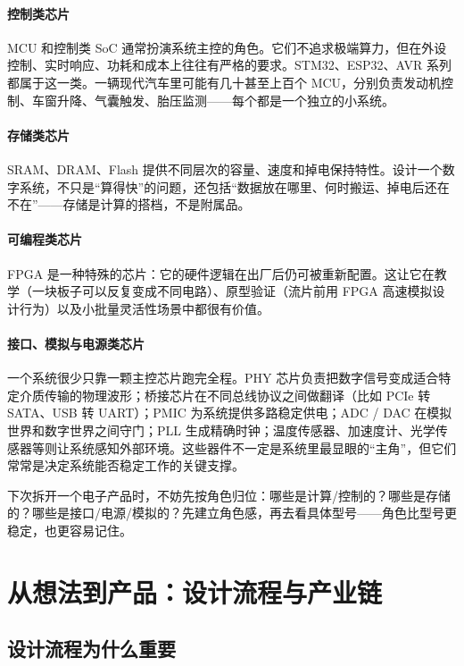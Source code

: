 \documentclass[11pt,a4paper]{article}
\begin{document}
\paragraph{控制类芯片}
MCU 和控制类 SoC 通常扮演系统主控的角色。它们不追求极端算力，但在外设控制、实时响应、功耗和成本上往往有严格的要求。STM32、ESP32、AVR 系列都属于这一类。一辆现代汽车里可能有几十甚至上百个 MCU，分别负责发动机控制、车窗升降、气囊触发、胎压监测——每个都是一个独立的小系统。

\paragraph{存储类芯片}
SRAM、DRAM、Flash 提供不同层次的容量、速度和掉电保持特性。设计一个数字系统，不只是``算得快''的问题，还包括``数据放在哪里、何时搬运、掉电后还在不在''——存储是计算的搭档，不是附属品。

\paragraph{可编程类芯片}
FPGA 是一种特殊的芯片：它的硬件逻辑在出厂后仍可被重新配置。这让它在教学（一块板子可以反复变成不同电路）、原型验证（流片前用 FPGA 高速模拟设计行为）以及小批量灵活性场景中都很有价值。

\paragraph{接口、模拟与电源类芯片}
一个系统很少只靠一颗主控芯片跑完全程。PHY 芯片负责把数字信号变成适合特定介质传输的物理波形；桥接芯片在不同总线协议之间做翻译（比如 PCIe 转 SATA、USB 转 UART）；PMIC 为系统提供多路稳定供电；ADC / DAC 在模拟世界和数字世界之间守门；PLL 生成精确时钟；温度传感器、加速度计、光学传感器等则让系统感知外部环境。这些器件不一定是系统里最显眼的``主角''，但它们常常是决定系统能否稳定工作的关键支撑。

\begin{tipbox}
下次拆开一个电子产品时，不妨先按角色归位：哪些是计算/控制的？哪些是存储的？哪些是接口/电源/模拟的？先建立角色感，再去看具体型号——角色比型号更稳定，也更容易记住。
\end{tipbox}

\section{从想法到产品：设计流程与产业链}

\subsection{设计流程为什么重要}
\end{document}
